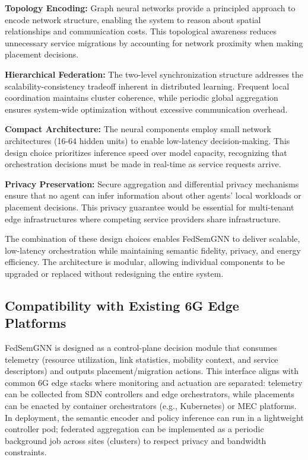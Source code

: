\documentclass[conference]{IEEEtran}
\begin{document}
	\textbf{Topology Encoding:} Graph neural networks provide a principled approach to encode network structure, enabling the system to reason about spatial relationships and communication costs. This topological awareness reduces unnecessary service migrations by accounting for network proximity when making placement decisions.
	
	\textbf{Hierarchical Federation:} The two-level synchronization structure addresses the scalability-consistency tradeoff inherent in distributed learning. Frequent local coordination maintains cluster coherence, while periodic global aggregation ensures system-wide optimization without excessive communication overhead.
	
	\textcolor{revblue}{\textbf{Compact Architecture:} The neural components employ small network architectures (16-64 hidden units) to enable low-latency decision-making. This design choice prioritizes inference speed over model capacity, recognizing that orchestration decisions must be made in real-time as service requests arrive.}
	
	\textbf{Privacy Preservation:} Secure aggregation and differential privacy mechanisms ensure that no agent can infer information about other agents' local workloads or placement decisions. This privacy guarantee would be essential for multi-tenant edge infrastructures where competing service providers share infrastructure.
	
	The combination of these design choices enables FedSemGNN to deliver scalable, low-latency orchestration while maintaining semantic fidelity, privacy, and energy efficiency. The architecture is modular, allowing individual components to be upgraded or replaced without redesigning the entire system.
	
	\subsection{Compatibility with Existing 6G Edge Platforms}
	FedSemGNN is designed as a control-plane decision module that consumes telemetry (resource utilization, link statistics, mobility context, and service descriptors) and outputs placement/migration actions. This interface aligns with common 6G edge stacks where monitoring and actuation are separated: telemetry can be collected from SDN controllers and edge orchestrators, while placements can be enacted by container orchestrators (e.g., Kubernetes) or MEC platforms. In deployment, the semantic encoder and policy inference can run in a lightweight controller pod; federated aggregation can be implemented as a periodic background job across sites (clusters) to respect privacy and bandwidth constraints.
	
\end{document}
